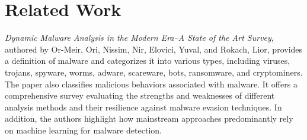 \section{Related Work}

\textit{Dynamic Malware Analysis in the Modern Era--A State of the Art Survey}\cite{10.1145/3329786}, authored by Or-Meir, Ori, Nissim, Nir, Elovici, Yuval, and Rokach, Lior, provides a definition of malware and categorizes it into various types, including viruses, trojans, spyware, worms, adware, scareware, bots, ransomware, and cryptominers. The paper also classifies malicious behaviors associated with malware. It offers a comprehensive survey evaluating the strengths and weaknesses of different analysis methods and their resilience against malware evasion techniques. In addition, the authors highlight how mainstream approaches predominantly rely on machine learning for malware detection.
